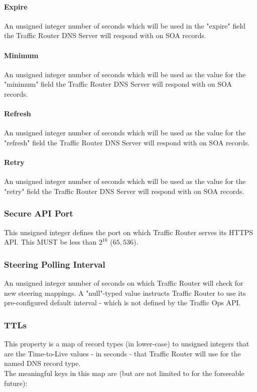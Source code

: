 \paragraph{Expire}
An unsigned integer number of seconds which will be used in the "expire" field
the Traffic Router DNS Server will respond with on SOA records.

\paragraph{Minimum}
An unsigned integer number of seconds which will be used as the value for the
"minimum" field the Traffic Router DNS Server will respond with on SOA records.

\paragraph{Refresh}
An unsigned integer number of seconds which will be used as the value for the
"refresh" field the Traffic Router DNS Server will respond with on SOA records.

\paragraph{Retry}
An unsigned integer number of seconds which will be used as the value for the
"retry" field the Traffic Router DNS Server will respond with on SOA records.

\subsubsection{Secure API Port}
This unsigned integer defines the port on which Traffic Router serves its HTTPS
API. This MUST be less than $2^{16}$ ($65,536$).

\subsubsection{Steering Polling Interval}
An unsigned integer number of seconds on which Traffic Router will check for new
steering mappings. A "null"-typed value instructs Traffic Router to use its
pre-configured default interval - which is not defined by the Traffic Ops API.

\subsubsection{TTLs}
This property is a map of record types (in lower-case) to unsigned integers that
are the Time-to-Live values - in seconds - that Traffic Router will use for the named
DNS record type.\\
The meaningful keys in this map are (but are not limited to for the forseeable
future):

